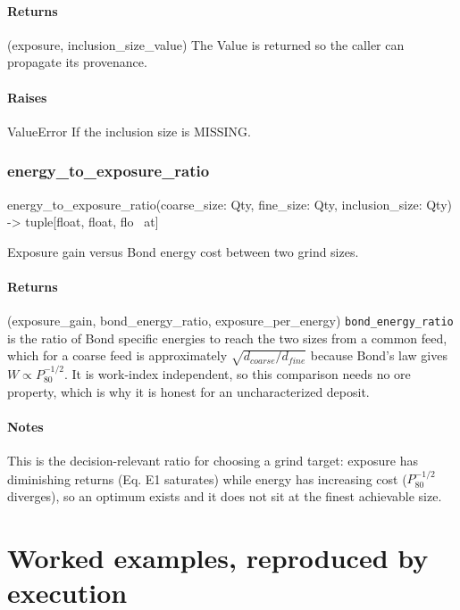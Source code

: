 \documentclass[10pt,a4paper,twoside]{report}
\begin{document}
\paragraph*{Returns}

(exposure, inclusion\_size\_value) The Value is returned so the caller can propagate its provenance.

\paragraph*{Raises}

ValueError If the inclusion size is MISSING.

\subsubsection*{energy\_to\_exposure\_ratio}

\begin{verbatimsmall}
energy_to_exposure_ratio(coarse_size: Qty, fine_size: Qty, inclusion_size: Qty) -> tuple[float, float, flo
    \ at]
\end{verbatimsmall}

Exposure gain versus Bond energy cost between two grind sizes.

\paragraph*{Returns}

(exposure\_gain, bond\_energy\_ratio, exposure\_per\_energy) \texttt{bond\_energy\_ratio} is the ratio of Bond specific energies to reach the two sizes from a common feed, which for a coarse feed is approximately $\sqrt{d_{coarse}/d_{fine}}$ because Bond's law gives $W \propto P_{80}^{-1/2}$. It is work-index independent, so this comparison needs no ore property, which is why it is honest for an uncharacterized deposit.

\paragraph*{Notes}

This is the decision-relevant ratio for choosing a grind target: exposure has diminishing returns (Eq. E1 saturates) while energy has increasing cost ($P_{80}^{-1/2}$ diverges), so an optimum exists and it does not sit at the finest achievable size.

\section{Worked examples, reproduced by execution}
\end{document}
